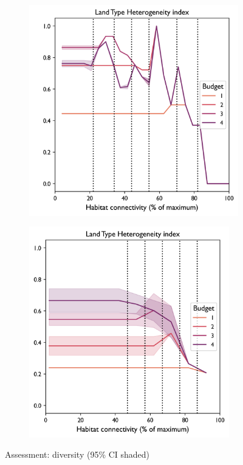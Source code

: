 \begin{figure}[H]
\begin{subfigure}[b]{0.4\textwidth}
         \caption{}
         \label{fig:indicator_LSI4}
     \end{subfigure}    
    \hfill
    \begin{subfigure}[b]{0.4\textwidth}
         \centering
         \includegraphics[width=\textwidth]{figures/wildland/diversity_index3.png}
         \caption{}
         \label{fig:indicator_diversity3}
     \end{subfigure}
    \begin{subfigure}[b]{0.4\textwidth}
         \centering
         \includegraphics[width=0.955\textwidth]{figures/wildland/diversity_index4.png}
         \caption{}
         \label{fig:indicator_diversity4}
    \end{subfigure}
        \caption{Assessment: diversity (95\% CI shaded)}
        \label{fig:indicators_2}
\end{figure}

